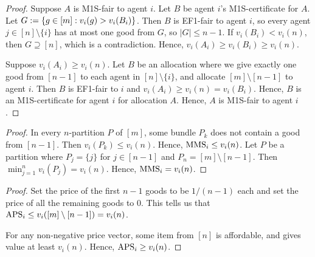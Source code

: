 \begin{proof}
Suppose $A$ is M1S-fair to agent $i$. Let $B$ be agent $i$'s M1S-certificate for $A$.
Let $G := \{g \in [m]: v_i(g) > v_i(B_i)\}$.
Then $B$ is EF1-fair to agent $i$, so every agent $j \in [n] \setminus \{i\}$
has at most one good from $G$, so $|G| \le n-1$.
If $v_i(B_i) < v_i(n)$, then $G \supseteq [n]$, which is a contradiction.
Hence, $v_i(A_i) \ge v_i(B_i) \ge v_i(n)$.

Suppose $v_i(A_i) \ge v_i(n)$. Let $B$ be an allocation where we give
exactly one good from $[n-1]$ to each agent in $[n] \setminus \{i\}$,
and allocate $[m] \setminus [n-1]$ to agent $i$.
Then $B$ is EF1-fair to $i$ and $v_i(A_i) \ge v_i(n) = v_i(B_i)$.
Hence, $B$ is an M1S-certificate for agent $i$ for allocation $A$.
Hence, $A$ is M1S-fair to agent $i$.
\end{proof}

\begin{proof}
In every $n$-partition $P$ of $[m]$, some bundle $P_k$ does not contain a good from $[n-1]$.
Then $v_i(P_k) \le v_i(n)$. Hence, $\mathrm{MMS}_i \le v_i(n)$.
Let $P$ be a partition where $P_j = \{j\}$ for $j \in [n-1]$ and $P_n = [m] \setminus [n-1]$.
Then $\min_{j=1}^n v_i(P_j) = v_i(n)$. Hence, $\mathrm{MMS}_i = v_i(n)$.
\end{proof}

\begin{proof}
Set the price of the first $n-1$ goods to be $1/(n-1)$ each
and set the price of all the remaining goods to 0.
This tells us that $\mathrm{APS}_i \le v_i([m] \setminus [n-1]) = v_i(n)$.

For any non-negative price vector, some item from $[n]$ is affordable,
and gives value at least $v_i(n)$. Hence, $\mathrm{APS}_i \ge v_i(n)$.
\end{proof}

